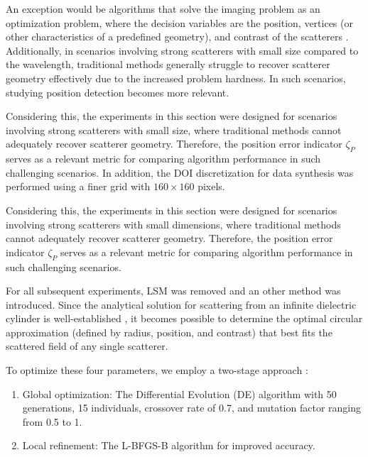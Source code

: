 \documentclass{IEEEtran}
\begin{document}
            An exception would be algorithms that solve the imaging problem as an optimization problem, where the decision variables are the position, vertices (or other characteristics of a predefined geometry), and contrast of the scatterers \cite{michalski2000electromagnetic,salucci2022learned,zardi2025physics}. Additionally, in scenarios involving strong scatterers with small size compared to the wavelength, traditional methods generally struggle to recover scatterer geometry effectively due to the increased problem hardness. In such scenarios, studying position detection becomes more relevant.


            Considering this, the experiments in this section were designed for scenarios involving strong scatterers with small size, where traditional methods cannot adequately recover scatterer geometry. Therefore, the position error indicator $\zeta_P$ serves as a relevant metric for comparing algorithm performance in such challenging scenarios. In addition, the DOI discretization for data synthesis was performed using a finer grid with $160 \times 160$ pixels.

            Considering this, the experiments in this section were designed for scenarios involving strong scatterers with small dimensions, where traditional methods cannot adequately recover scatterer geometry. Therefore, the position error indicator $\zeta_P$ serves as a relevant metric for comparing algorithm performance in such challenging scenarios.

            For all subsequent experiments, LSM was removed and an other method was introduced. Since the analytical solution for scattering from an infinite dielectric cylinder is well-established \cite{harrington2001time}, it becomes possible to determine the optimal circular approximation (defined by radius, position, and contrast) that best fits the scattered field of any single scatterer.

            To optimize these four parameters, we employ a two-stage approach \cite{virtanen2020SciPy}:
            \begin{enumerate}
                \item Global optimization: The Differential Evolution (DE) algorithm \cite{storn1997differential} with 50 generations, 15 individuals, crossover rate of 0.7, and mutation factor ranging from 0.5 to 1.
                \item Local refinement: The L-BFGS-B algorithm \cite{zhu1997algorithm} for improved accuracy.
            \end{enumerate}
\end{document}
